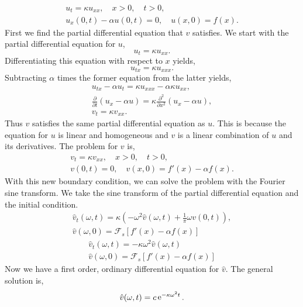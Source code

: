 {%
\begin{Solution}
  \begin{gather*}
    u_t = \kappa u_{x x}, \quad x > 0, \quad t > 0, \\
    u_x(0,t) - \alpha u(0,t) = 0, \quad u(x,0) = f(x).
  \end{gather*}
  First we find the partial differential equation that $v$ satisfies.  We 
  start with the partial differential equation for $u$,
  \[
  u_t = \kappa u_{x x}.
  \]
  Differentiating this equation with respect to $x$ yields,
  \[
  u_{t x} = \kappa u_{x x x}.
  \]
  Subtracting $\alpha$ times the former equation from the latter yields,
  \begin{gather*}
    u_{t x} - \alpha u_t = \kappa u_{x x x} - \alpha \kappa u_{x x}, \\
    \frac{\partial}{\partial t} \left( u_x - \alpha u \right)
    = \kappa \frac{\partial^2}{\partial x^2} \left( u_x - \alpha u \right),\\
    v_t = \kappa v_{x x}.
  \end{gather*}
  Thus $v$ satisfies the same partial differential equation as $u$.  This is
  because the equation for $u$ is linear and homogeneous and $v$ is a linear
  combination of $u$ and its derivatives.  The problem for $v$ is,
  \begin{gather*}
    v_t = \kappa v_{x x}, \quad x > 0, \quad t > 0, \\
    v(0,t) = 0, \quad v(x,0) = f'(x) - \alpha f(x).
  \end{gather*}
  With this new boundary condition, we can solve the problem with the 
  Fourier sine transform.  We take the sine transform of the partial differential
  equation and the initial condition.  
  \begin{gather*}
    \hat{v}_t(\omega,t) = \kappa \left( - \omega^2 \hat{v}(\omega, t) 
      + \frac{1}{\pi} \omega v(0,t) \right), \\
    \hat{v}(\omega,0) = \mathcal{F}_s \left[ f'(x) - \alpha f(x) \right]
  \end{gather*}
  \begin{gather*}
    \hat{v}_t(\omega,t) = - \kappa \omega^2 \hat{v}(\omega, t) \\
    \hat{v}(\omega,0) = \mathcal{F}_s \left[ f'(x) - \alpha f(x) \right]
  \end{gather*}
  Now we have a first order, ordinary differential equation for $\hat{v}$.  The 
  general solution is,
  \[
  \hat{v}(\omega,t) = c \mathop{\mathrm{e}}\nolimits^{-\kappa \omega^2 t}.
  \]

\end{Solution}}

